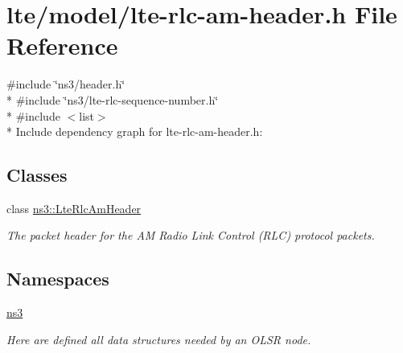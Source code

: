 \hypertarget{lte-rlc-am-header_8h}{}\section{lte/model/lte-\/rlc-\/am-\/header.h File Reference}
\label{lte-rlc-am-header_8h}
{\ttfamily \#include \char`\"{}ns3/header.\+h\char`\"{}}\\*
{\ttfamily \#include \char`\"{}ns3/lte-\/rlc-\/sequence-\/number.\+h\char`\"{}}\\*
{\ttfamily \#include $<$list$>$}\\*
Include dependency graph for lte-\/rlc-\/am-\/header.h\+:
\subsection*{Classes}
\begin{DoxyCompactItemize}
\item 
class \hyperlink{classns3_1_1LteRlcAmHeader}{ns3\+::\+Lte\+Rlc\+Am\+Header}
\begin{DoxyCompactList}\small\item\em The packet header for the AM Radio Link Control (R\+LC) protocol packets. \end{DoxyCompactList}\end{DoxyCompactItemize}
\subsection*{Namespaces}
\begin{DoxyCompactItemize}
\item 
 \hyperlink{namespacens3}{ns3}
\begin{DoxyCompactList}\small\item\em Here are defined all data structures needed by an O\+L\+SR node. \end{DoxyCompactList}\end{DoxyCompactItemize}
